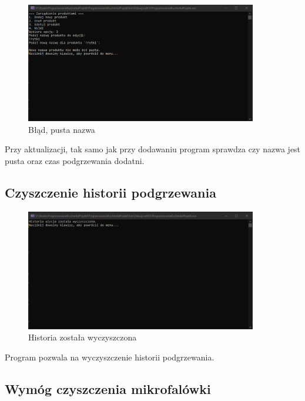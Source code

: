 \begin{figure}[h]
    \centering
    \includegraphics[width=0.9\textwidth]{Menu10.png}
      \caption{Błąd, pusta nazwa}
    \label{fig:example}
\end{figure}

Przy aktualizacji, tak samo jak przy dodawaniu program sprawdza czy nazwa jest pusta oraz czas podgrzewania dodatni.
\newpage
\subsection{Czyszczenie historii podgrzewania}

\begin{figure}[h]
    \centering
    \includegraphics[width=0.9\textwidth]{Menu11.png}
      \caption{Historia została wyczyszczona}
    \label{fig:example}
\end{figure}

Program pozwala na wyczyszczenie historii podgrzewania.

\subsection{Wymóg czyszczenia mikrofalówki}

